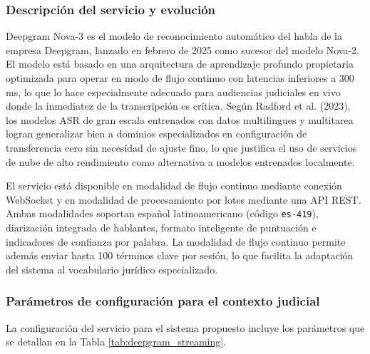 \documentclass[12pt,a4paper,oneside]{article}
\begin{document}
\subsubsection{Descripci\'on del servicio y evoluci\'on}

Deepgram Nova-3 es el modelo de reconocimiento autom\'atico del habla de la empresa Deepgram, lanzado en febrero de 2025 como sucesor del modelo Nova-2. El modelo est\'a basado en una arquitectura de aprendizaje profundo propietaria optimizada para operar en modo de flujo continuo con latencias inferiores a 300 ms, lo que lo hace especialmente adecuado para audiencias judiciales en vivo donde la inmediatez de la transcripci\'on es cr\'itica. Seg\'un Radford et al. (2023), los modelos ASR de gran escala entrenados con datos multilingues y multitarea logran generalizar bien a dominios especializados en configuraci\'on de transferencia cero sin necesidad de ajuste fino, lo que justifica el uso de servicios de nube de alto rendimiento como alternativa a modelos entrenados localmente.

El servicio est\'a disponible en modalidad de flujo continuo mediante conexi\'on WebSocket y en modalidad de procesamiento por lotes mediante una API REST. Ambas modalidades soportan espa\~nol latinoamericano (c\'odigo \texttt{es-419}), diarizaci\'on integrada de hablantes, formato inteligente de puntuaci\'on e indicadores de confianza por palabra. La modalidad de flujo continuo permite adem\'as enviar hasta 100 t\'erminos clave por sesi\'on, lo que facilita la adaptaci\'on del sistema al vocabulario jur\'idico especializado.

\subsubsection{Par\'ametros de configuraci\'on para el contexto judicial}

La configuraci\'on del servicio para el sistema propuesto incluye los par\'ametros que se detallan en la Tabla \ref{tab:deepgram_streaming}.
\end{document}

